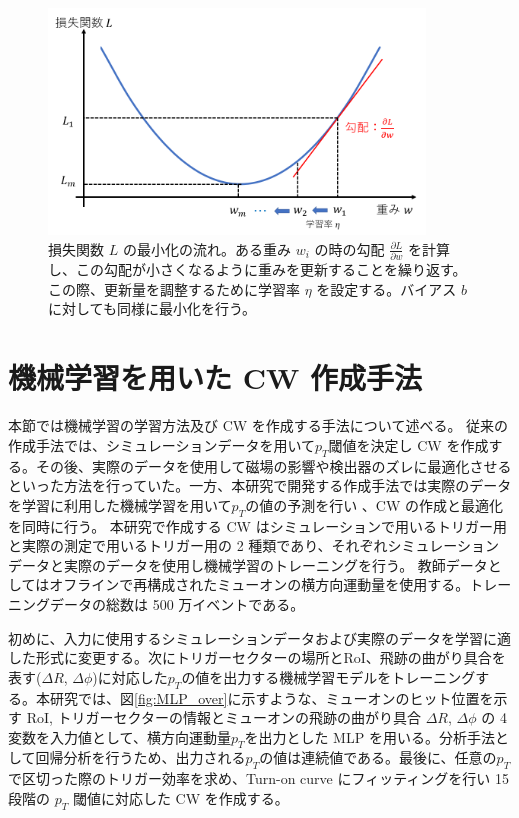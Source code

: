 \begin{figure}[tb]
  \centering
  \includegraphics[clip, width=10cm]{fig/4/lossfunc_laerning.png}
  \caption{損失関数 $L$ の最小化の流れ。ある重み $w_i$ の時の勾配 $\frac{\partial L}{\partial w}$ を計算し、この勾配が小さくなるように重みを更新することを繰り返す。この際、更新量を調整するために学習率 $\eta$ を設定する。バイアス $b$ に対しても同様に最小化を行う。}
  \label{fig:lossfunction}
\end{figure}

\section{機械学習を用いた CW 作成手法}
本節では機械学習の学習方法及び CW を作成する手法について述べる。
従来の作成手法では、シミュレーションデータを用いて$p_T$閾値を決定し CW を作成する。その後、実際のデータを使用して磁場の影響や検出器のズレに最適化させるといった方法を行っていた。一方、本研究で開発する作成手法では実際のデータを学習に利用した機械学習を用いて$p_T$の値の予測を行い 、CW の作成と最適化を同時に行う。
本研究で作成する CW はシミュレーションで用いるトリガー用と実際の測定で用いるトリガー用の 2 種類であり、それぞれシミュレーションデータと実際のデータを使用し機械学習のトレーニングを行う。
教師データとしてはオフラインで再構成されたミューオンの横方向運動量を使用する。トレーニングデータの総数は 500 万イベントである。

初めに、入力に使用するシミュレーションデータおよび実際のデータを学習に適した形式に変更する。次にトリガーセクターの場所とRoI、飛跡の曲がり具合を表す($\Delta R$, $\Delta \phi$)に対応した$p_T$の値を出力する機械学習モデルをトレーニングする。本研究では、図\ref{fig:MLP_over}に示すような、ミューオンのヒット位置を示す RoI, トリガーセクターの情報とミューオンの飛跡の曲がり具合 $\Delta R$, $\Delta \phi$ の 4 変数を入力値として、横方向運動量$p_T$を出力とした MLP を用いる。分析手法として回帰分析を行うため、出力される$p_T$の値は連続値である。最後に、任意の$p_T$で区切った際のトリガー効率を求め、Turn-on curve にフィッティングを行い 15 段階の $p_T$ 閾値に対応した CW を作成する。

